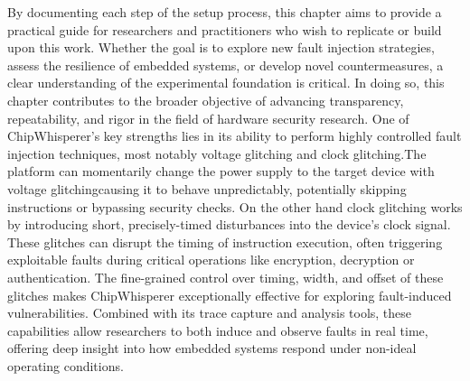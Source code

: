  By documenting each step of the setup process, this chapter aims to provide a practical guide for researchers and practitioners who wish to replicate or build upon this work. Whether the goal is to explore new fault injection strategies, assess the resilience of embedded systems, or develop novel countermeasures, a clear understanding of the experimental foundation is critical. In doing so, this chapter contributes to the broader objective of advancing transparency, repeatability, and rigor in the field of hardware security research.
One of ChipWhisperer’s key strengths lies in its ability to perform highly controlled fault injection techniques, most notably voltage glitching and clock glitching.The platform can momentarily change the power supply to the target device with voltage glitchingcausing it to behave unpredictably, potentially skipping instructions or bypassing security checks. On the other hand clock glitching works by introducing short, precisely-timed disturbances into the device’s clock signal. These glitches can disrupt the timing of instruction execution, often triggering exploitable faults during critical operations like encryption, decryption or authentication. The fine-grained control over timing, width, and offset of these glitches makes ChipWhisperer exceptionally effective for exploring fault-induced vulnerabilities. Combined with its trace capture and analysis tools, these capabilities allow researchers to both induce and observe faults in real time, offering deep insight into how embedded systems respond under non-ideal operating conditions.

